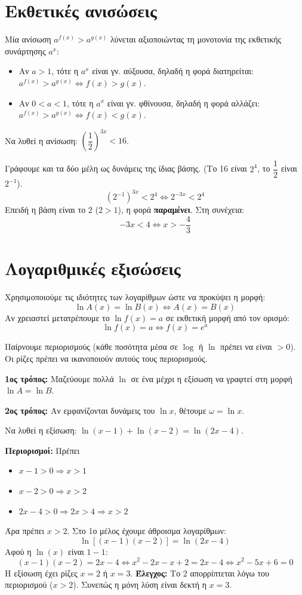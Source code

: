 \section{Εκθετικές ανισώσεις}

Μία ανίσωση $a^{f(x)} > a^{g(x)}$ λύνεται αξιοποιώντας τη μονοτονία της εκθετικής συνάρτησης $a^x$:
\begin{itemize}
    \item Αν ${a > 1}$, τότε η $a^x$ είναι γν. αύξουσα, δηλαδή η φορά διατηρείται: $a^{f(x)} > a^{g(x)} \Leftrightarrow f(x) > g(x)$.
    \item Αν ${0 < a < 1}$, τότε η $a^x$ είναι γν. φθίνουσα, δηλαδή η φορά αλλάζει: $a^{f(x)} > a^{g(x)} \Leftrightarrow f(x) < g(x)$.
\end{itemize}

Να λυθεί η ανίσωση: $\left(\dfrac{1}{2}\right)^{3x} < 16$.

\lysh
Γράφουμε και τα δύο μέλη ως δυνάμεις της ίδιας βάσης. (Το 16 είναι $2^4$, το $\dfrac{1}{2}$ είναι $2^{-1}$).
\[ (2^{-1})^{3x} < 2^4 \Leftrightarrow 2^{-3x} < 2^4 \]
Επειδή η βάση είναι το 2 ($2 > 1$), η φορά \textbf{παραμένει}. Στη συνέχεια:
\[ -3x < 4 \Leftrightarrow x > -\dfrac{4}{3} \]

\section{Λογαριθμικές εξισώσεις}
Χρησιμοποιούμε τις ιδιότητες των λογαρίθμων ώστε να προκύψει η μορφή:
\[ \ln A(x) = \ln B(x) \Leftrightarrow A(x) = B(x) \]
Αν χρειαστεί μετατρέπουμε το $\ln f(x) = a$ σε εκθετική μορφή από τον ορισμό:
\[ \ln f(x) = a \Leftrightarrow f(x) = e^a \]

\bhmata
\begin{bhma}
    \item Παίρνουμε περιορισμούς (κάθε ποσότητα μέσα σε $\log$ ή $\ln$ πρέπει να είναι $> 0$). Οι ρίζες πρέπει να ικανοποιούν αυτούς τους περιορισμούς.
    \item \textbf{1ος τρόπος:} Μαζεύουμε πολλά $\ln$ σε ένα μέχρι η εξίσωση να γραφτεί στη μορφή $\ln A = \ln B$.
    \item \textbf{2ος τρόπος:} Αν εμφανίζονται δυνάμεις του $\ln x$, θέτουμε $\omega = \ln x$. 
\end{bhma}


Να λυθεί η εξίσωση: $\ln(x-1) + \ln(x-2) = \ln(2x-4)$.

\lysh
\textbf{Περιορισμοί:}
Πρέπει 
\begin{itemize}
\item $x-1 > 0 \Rightarrow x > 1$
\item $x-2 > 0 \Rightarrow x > 2$
\item $2x-4 > 0 \Rightarrow 2x > 4 \Rightarrow x > 2$
\end{itemize}
 Άρα πρέπει {$x > 2$}. Στο 1ο μέλος έχουμε άθροισμα λογαρίθμων:
\[ \ln[(x-1)(x-2)] = \ln(2x-4) \]
Αφού η $\ln(x)$ είναι $1-1$:
\[ (x-1)(x-2) = 2x-4 \Leftrightarrow x^2 - 2x - x + 2 = 2x - 4 \Leftrightarrow x^2 - 5x + 6 = 0 \]
Η εξίσωση έχει ρίζες $x = 2$ ή $x = 3$.
\textbf{Έλεγχος:} Το 2 απορρίπτεται λόγω του περιορισμού ($x > 2$). Συνεπώς η μόνη λύση είναι δεκτή η $x = 3$.

